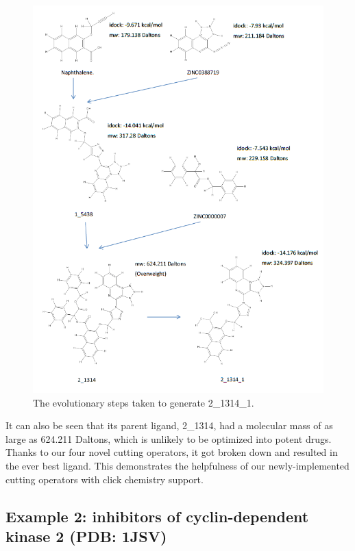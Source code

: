 \begin{figure}
\begin{center}
\includegraphics[width=\linewidth]{../isyn/2_1314_1.png}
\end{center}
\caption{The evolutionary steps taken to generate 2\_1314\_1.}
\label{isyn:2_1314_1}
\end{figure}

It can also be seen that its parent ligand, 2\_1314, had a molecular mass of as large as 624.211 Daltons, which is unlikely to be optimized into potent drugs. Thanks to our four novel cutting operators, it got broken down and resulted in the ever best ligand. This demonstrates the helpfulness of our newly-implemented cutting operators with click chemistry support.

\subsection{Example 2: inhibitors of cyclin-dependent kinase 2 (PDB: 1JSV)}

